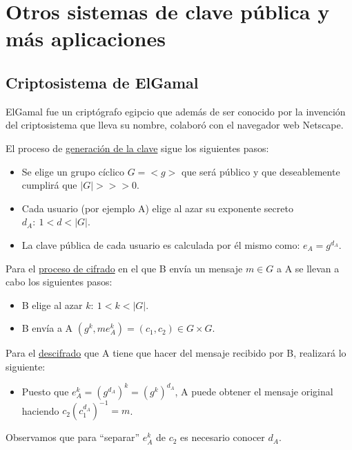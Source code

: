 \chapter{Otros sistemas de clave pública y más aplicaciones}
\section{Criptosistema de ElGamal}
ElGamal fue un criptógrafo egipcio que además de ser conocido por la invención del criptosistema que lleva su nombre, colaboró con el navegador web Netscape.

El proceso de \underline{generación de la clave} sigue los siguientes pasos:
\begin{itemize}
	\item Se elige un grupo cíclico $G=<g>$ que será público y que deseablemente cumplirá que $|G| >>> 0$.
	\item Cada usuario (por ejemplo A) elige al azar su exponente secreto $d_A:\ 1<d<|G|$.
	\item La clave pública de cada usuario es calculada por él mismo como: $e_A=g^{d_A}$.
\end{itemize}

Para el \underline{proceso de cifrado} en el que B envía un mensaje $m∈G$ a A se llevan a cabo los siguientes pasos:
\begin{itemize}
	\item B elige al azar $k:\ 1 < k < |G|$.
	\item B envía a A $(g^k,me_A^k)=(c_1,c_2)∈G×G$.
\end{itemize}

Para el \underline{descifrado} que A tiene que hacer del mensaje recibido por B, realizará lo siguiente:
\begin{itemize}
	\item Puesto que $e_A^k = (g^{d_A})^k = (g^k)^{d_A}$, A puede obtener el mensaje original haciendo $c_2(c_1^{d_A})^{-1}=m$.
\end{itemize}

Observamos que para ``separar'' $e_A^k$ de $c_2$ es necesario conocer $d_A$.
